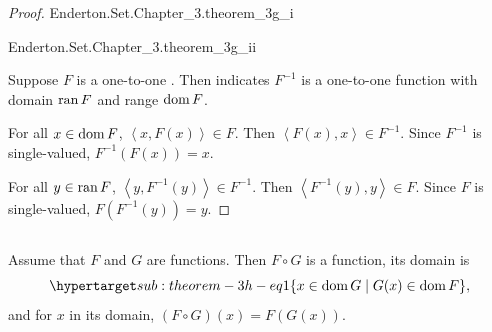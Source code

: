 \documentclass{report}
\newcommand{\pair}[1]{\left< #1 \right>}
\begin{document}
\begin{proof}

  \statementpadding

    {Enderton.Set.Chapter\_3.theorem\_3g\_i}

    {Enderton.Set.Chapter\_3.theorem\_3g\_ii}

  Suppose $F$ is a one-to-one .
  Then  indicates $F^{-1}$ is a one-to-one
    function with domain $\mathop{\text{ran}}{F}$ and range $\mathop{\text{dom}}{F}$.

  For all $x \in \mathop{\text{dom}}{F}$, $\pair{x, F(x)} \in F$.
  Then $\pair{F(x), x} \in F^{-1}$.
  Since $F^{-1}$ is single-valued, $F^{-1}(F(x)) = x$.

  For all $y \in \mathop{\text{ran}}{F}$, $\pair{y, F^{-1}(y)} \in F^{-1}$.
  Then $\pair{F^{-1}(y), y} \in F$.
  Since $F$ is single-valued, $F(F^{-1}(y)) = y$.

\end{proof}

\subsection{}%

\begin{theorem}[3H]

  Assume that $F$ and $G$ are functions.
  Then $F \circ G$ is a function, its domain is
    \begin{equation}
      \hyperlabel{sub:theorem-3h-eq1}
      \{x \in \dom{G} \mid G(x) \in \dom{F}\},
    \end{equation}
    and for $x$ in its domain, $(F \circ G)(x) = F(G(x))$.

\end{theorem}
\end{document}
